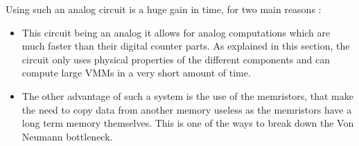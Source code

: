 Using such an analog circuit is a huge gain in time, for two main reasons :

\begin{itemize}
  \item This circuit being an analog it allows for analog computations which are much faster than their digital counter parts. As explained in this section, the circuit only uses physical properties of the different components and can compute large \acp{VMM} in a very short amount of time.
  \item The other advantage of such a system is the use of the memristors, that make the need to copy data from another memory useless as the memristors have a long term memory themselves. This is one of the ways to break down the Von Neumann bottleneck.
\end{itemize}
